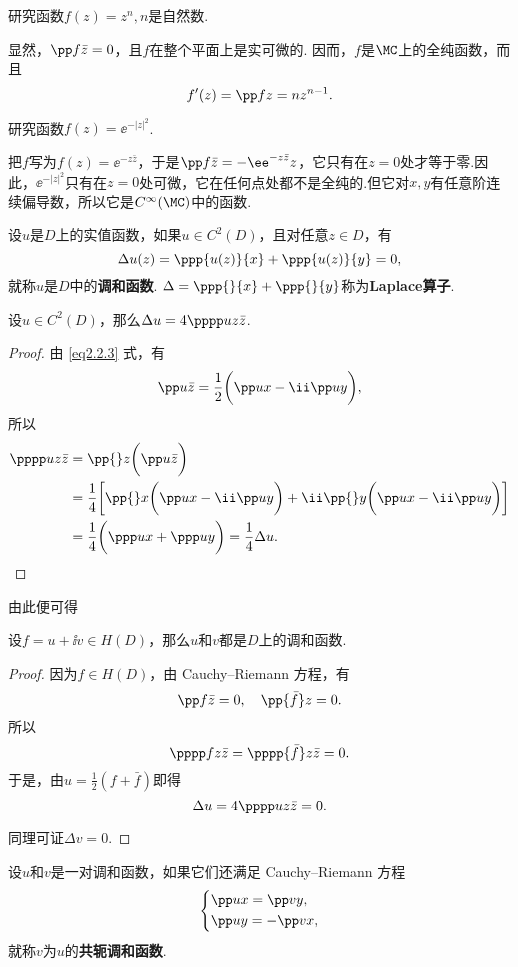 \begin{example}
研究函数$f(z)=z^n,n$是自然数.
\end{example}
\begin{solution}
  显然，$\pp f{\bar z}=0$，且$f$在整个平面上是实可微的. 因而，$f$是$\MC$上的全纯函数，而且
  \[f'(z)=\pp fz=nz^{n-1}.\]
\end{solution}

\begin{example}
研究函数$f(z)=\ee^{-|z|^2}$.
\end{example}
\begin{solution}
把$f$写为$f(z)=\ee^{-z\bar z}$，于是$\pp f{\bar z}=-\ee^{-z\bar z}z$，它只有在$z=0$处才等于零.因此，$\ee^{-|z|^2}$只有在$z=0$处可微，它在任何点处都不是全纯的.但它对$x,y$有任意阶连续偏导数，所以它是$C^\infty(\MC)$中的函数.
\end{solution}

\begin{definition}\label{def2.2.7}
  设$u$是$D$上的实值函数，如果$u\in C^2(D)$，且对任意$z\in D$，有
  \[\Delta u(z)=\ppp{u(z)}{x}+\ppp{u(z)}{y}=0,\]
就称$u$是$D$中的\textbf{调和函数}. $\Delta =\ppp{}{x}+\ppp{}{y}$称为\textbf{Laplace算子}.
\end{definition}

\begin{prop}\label{prop2.2.8}
设$u\in C^2(D)$，那么$\Delta u=4\pppp uz{\bar z}$.
\end{prop}
\begin{proof}
由 \eqref{eq2.2.3} 式，有
\[\pp u{\bar z}=\frac12\bigg(\pp ux-\ii\pp uy\bigg),\]
所以
\begin{align*}
\pppp uz{\bar z}&=\pp {}z\bigg(\pp u{\bar z}\bigg)\\
&=\frac14\bigg[\pp{}x\bigg(\pp ux-\ii \pp uy\bigg)+\ii\pp{}y\bigg(\pp ux-\ii\pp uy\bigg)\bigg]\\
&=\frac14\bigg(\ppp ux+\ppp uy\bigg)=\frac14\Delta u.
\end{align*}
\end{proof}

由此便可得
\begin{theorem}\label{thm2.2.9}
  设$f=u+\ii v\in H(D)$，那么$u$和$v$都是$D$上的调和函数.
\end{theorem}
\begin{proof}
因为$f\in H(D)$，由 Cauchy--Riemann 方程，有
\[\pp f{\bar z}=0,\quad \pp{\bar f}z=0.\]
所以
\[\pppp fz{\bar z}=\pppp{\bar f}z{\bar z}=0.\]
于是，由$u=\frac12(f+\bar f)$即得
\[\Delta u=4\pppp uz{\bar z}=0.\]

同理可证$\Delta v=0$.
\end{proof}
\begin{definition}\label{def2.2.10}
设$u$和$v$是一对调和函数，如果它们还满足 Cauchy--Riemann 方程
\[\left\{\begin{aligned}
&\pp ux=\pp vy,\\
&\pp uy=-\pp vx,
\end{aligned}\right.\]
就称$v$为$u$的\textbf{共轭调和函数}.
\end{definition}

